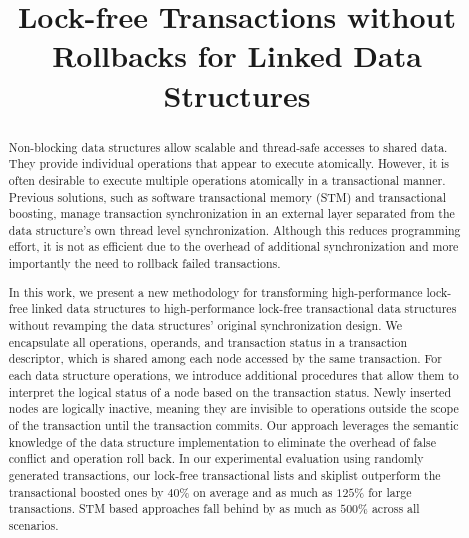 \documentclass[10pt,conference,compsocconf]{IEEEtran}
\begin{document}
\title{Lock-free Transactions without Rollbacks for Linked Data Structures}

\author{
}

\maketitle

\begin{abstract}
    Non-blocking data structures allow scalable and thread-safe accesses to shared data. 
    They provide individual operations that appear to execute atomically.
    However, it is often desirable to execute multiple operations atomically in a transactional manner.
    Previous solutions, such as software transactional memory (STM) and transactional boosting, manage transaction synchronization in an external layer separated from the data structure's own thread level synchronization.
    Although this reduces programming effort, it is not as efficient due to the overhead of additional synchronization and more importantly the need to rollback failed transactions.
    
    In this work, we present a new methodology for transforming high-performance lock-free linked data structures to high-performance lock-free transactional data structures without revamping the data structures' original synchronization design.
    We encapsulate all operations, operands, and transaction status in a transaction descriptor, which is shared among each node accessed by the same transaction.
    For each data structure operations, we introduce additional procedures that allow them to interpret the logical status of a node based on the transaction status. 
    Newly inserted nodes are logically inactive, meaning they are invisible to operations outside the scope of the transaction until the transaction commits.
    Our approach leverages the semantic knowledge of the data structure implementation to eliminate the overhead of false conflict and operation roll back.
    In our experimental evaluation using randomly generated transactions, our lock-free transactional lists and skiplist outperform the transactional boosted ones by $40\%$ on average and as much as $125\%$ for large transactions.
    STM based approaches fall behind by as much as $500\%$ across all scenarios.
\end{abstract}
\end{document}
